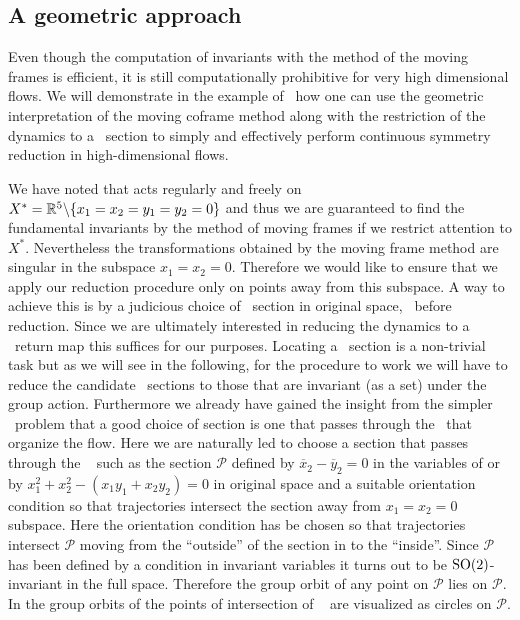 \subsection{A geometric approach}
\label{laserMFnum}

Even though the computation of invariants with the method of
the moving frames is efficient, it is still computationally
prohibitive for very high dimensional flows. We will
demonstrate in the example of \CLe\ how one can use the
geometric interpretation of the moving coframe method along
with the restriction of the dynamics to a \Poincare\ section
to simply and effectively perform continuous symmetry
reduction in high-dimensional flows.

We have noted that  acts regularly and freely on
$X^*=\mathbb{R}^{5}\backslash\{x_1=x_2=y_1=y_2=0\}$ and thus we are
guaranteed to find the fundamental invariants by the method
of moving frames if we restrict attention to $X^*$.
Nevertheless the transformations  obtained
by the moving frame method are singular in the subspace
$x_1=x_2=0$.
Therefore we would like to ensure that we apply our
reduction procedure only on points away from this subspace. A
way to achieve this is by a judicious choice of \Poincare\
section in original space, \ie~before reduction. Since we are
ultimately interested in reducing the dynamics to a
\Poincare\ return map this suffices for our purposes.
Locating a \Poincare\ section is a non-trivial task
but as we will see in the following, for the procedure to
work we will have to reduce the candidate \Poincare\ sections
to those that are invariant (as a set) under the group
action. Furthermore we already have gained the insight from
the simpler \Le\ problem that a good choice of section is one
that passes through the \eqva\ that organize the flow. Here
we are naturally led to choose a section that passes through
the \reqv~ such as the section $\mathcal{P}$
defined by $\overline{x}_2-\overline{y}_2=0$ in the variables
of  or by $x_1^2+x_2^2-(x_1 y_1 + x_2
y_2)=0$ in original space and a suitable orientation
condition so that trajectories intersect the section away
from $x_1=x_2=0$ subspace. Here the orientation condition has
be chosen so that trajectories intersect $\mathcal{P}$ moving
from the ``outside'' of the section in
 to the ``inside''. Since
$\mathcal{P}$ has been defined by a condition in invariant
variables  it turns out to be
$\textrm{SO}(2)$-invariant in the full space. Therefore the group
orbit of any point on $\mathcal{P}$ lies on $\mathcal{P}$. In
 the group orbits of the points of
intersection of \rpo~ are visualized as circles
on $\mathcal{P}$.

